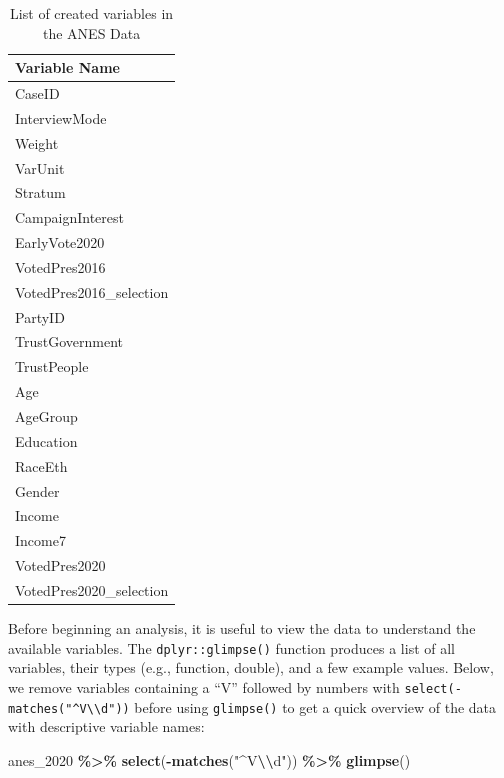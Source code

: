 \documentclass[
]{krantz}
\makeatletter
\newenvironment{Shaded}{\begin{snugshade}}{\end{snugshade}}
\newcommand{\FunctionTok}[1]{\textcolor[rgb]{0.27,0.27,0.27}{\textbf{#1}}}
\newcommand{\NormalTok}[1]{#1}
\newcommand{\SpecialCharTok}[1]{\textcolor[rgb]{0.43,0.43,0.43}{\textbf{#1}}}
\newcommand{\StringTok}[1]{\textcolor[rgb]{0.5,0.5,0.5}{#1}}
\newenvironment{kframe}{%
\medskip{}
\setlength{\fboxsep}{.8em}
 \def\at@end@of@kframe{}%
 \ifinner\ifhmode%
  \def\at@end@of@kframe{\end{minipage}}%
  \begin{minipage}{\columnwidth}%
 \fi\fi%
 \def\FrameCommand##1{\hskip\@totalleftmargin \hskip-\fboxsep
 \colorbox{shadecolor}{##1}\hskip-\fboxsep
     \hskip-\linewidth \hskip-\@totalleftmargin \hskip\columnwidth}%
 \MakeFramed {\advance\hsize-\width
   \@totalleftmargin\z@ \linewidth\hsize
   \@setminipage}}%
 {\par\unskip\endMakeFramed%
 \at@end@of@kframe}
\renewenvironment{Shaded}{\begin{kframe}}{\end{kframe}}
\makeatother
\begin{document}
\begin{longtable}{l}
\caption{\label{tab:anes-view-tab}List of created variables in the ANES Data}\\
\toprule
Variable Name \\ 
\midrule
CaseID \\ 
InterviewMode \\ 
Weight \\ 
VarUnit \\ 
Stratum \\ 
CampaignInterest \\ 
EarlyVote2020 \\ 
VotedPres2016 \\ 
VotedPres2016\_selection \\ 
PartyID \\ 
TrustGovernment \\ 
TrustPeople \\ 
Age \\ 
AgeGroup \\ 
Education \\ 
RaceEth \\ 
Gender \\ 
Income \\ 
Income7 \\ 
VotedPres2020 \\ 
VotedPres2020\_selection \\ 
\bottomrule
\end{longtable}

Before beginning an analysis, it is useful to view the data to understand the available variables. The \texttt{dplyr::glimpse()} function produces a list of all variables, their types (e.g., function, double), and a few example values. Below, we remove variables containing a ``V'' followed by numbers with \texttt{select(-matches("\^{}V\textbackslash{}\textbackslash{}d"))} before using \texttt{glimpse()} to get a quick overview of the data with descriptive variable names:

\begin{Shaded}
\begin{Highlighting}[]
\NormalTok{anes\_2020 }\SpecialCharTok{\%\textgreater{}\%}
  \FunctionTok{select}\NormalTok{(}\SpecialCharTok{{-}}\FunctionTok{matches}\NormalTok{(}\StringTok{"\^{}V}\SpecialCharTok{\textbackslash{}\textbackslash{}}\StringTok{d"}\NormalTok{)) }\SpecialCharTok{\%\textgreater{}\%}
  \FunctionTok{glimpse}\NormalTok{()}
\end{Highlighting}
\end{Shaded}
\end{document}
